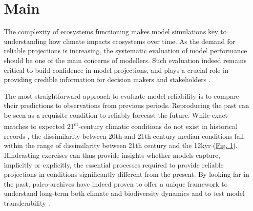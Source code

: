 \documentclass[pdflatex, sn-nature]{sn-jnl}%
\begin{document}

\maketitle

\newpage




\section{Main}
  
The complexity of ecosystems functioning makes model simulations key to understanding how climate impacts ecosystems over time. As the demand for reliable projections is increasing, the systematic evaluation of model performance should be one of the main concerns of modellers. Such evaluation indeed remains critical to build confidence in model projections, and plays a crucial role in providing credible information for decision makers and stakeholders \cite{Dawson2011, Mouquet2015, Pacifici2015}.

The most straightforward approach to evaluate model reliability is to compare their predictions to observations from previous periods. Reproducing the past can be seen as a requisite condition to reliably forecast the future. While exact matches to expected 21\textsuperscript{st}-century climatic conditions do not exist in historical records \cite{Burke2018}, the dissimilarity between 20th and 21th century median conditions fall within the range of dissimilarity between 21th century and the 12kyr (\hyperref[climatic_dissimilarity]{Fig. 1}). Hindcasting exercises can thus provide insights whether models capture, implicitly or explicitly, the essential processes required to provide reliable projections in conditions significantly different from the present. By looking far in the past, paleo-archives have indeed proven to offer a unique framework to understand long-term both climate and biodiversity dynamics \cite{Fordham2020} and to test model transferability  \cite{Braconnot2012, Maguire2015}.
\end{document}
